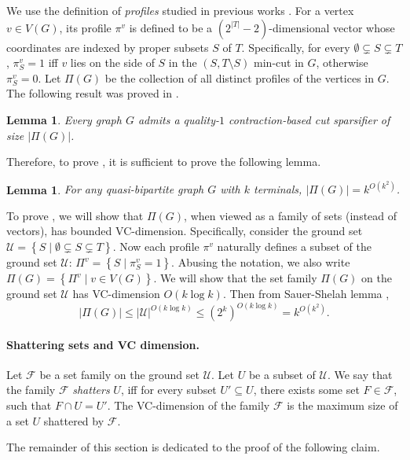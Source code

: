 \documentclass[11pt]{article}
\newtheorem{lemma}[theorem]{Lemma}
\theoremstyle{definition}
\newcommand{\set}[1]{\left\{ #1 \right\}}
\newcommand{\uset}{{\mathcal U}}
\newcommand{\fset}{{\mathcal{F}}}
\begin{document}
We use the definition of \emph{profiles} studied in previous works \cite{hagerup1998characterizing,khan2014mimicking}.
For a vertex $v\in V(G)$, its profile $\pi^v$ is defined to be a $(2^{|T|}-2)$-dimensional vector whose coordinates are indexed by proper subsets $S$ of $T$. Specifically, for every $\emptyset \subsetneq S\subsetneq T$, $\pi^v_S=1$ iff $v$ lies on the side of $S$ in the $(S,T \setminus S)$ min-cut in $G$, otherwise $\pi^v_S=0$. 
Let $\Pi(G)$ be the collection of all distinct profiles of the vertices in $G$.
The following result was proved in \cite{hagerup1998characterizing}.

\begin{lemma}
Every graph $G$ admits a quality-$1$ contraction-based cut sparsifier of size $|\Pi(G)|$.
\end{lemma}

Therefore, to prove , it is sufficient to prove the following lemma.

\begin{lemma} \label{quasi_profile}
For any quasi-bipartite graph $G$ with $k$ terminals, $|\Pi(G)|=k^{O(k^2)}$.
\end{lemma}

To prove , we will show that $\Pi(G)$, when viewed as a family of sets (instead of vectors), has bounded VC-dimension.
Specifically, consider the ground set $\uset=\set{S\mid \emptyset \subsetneq S\subsetneq T}$.
Now each profile $\pi^v$ naturally defines a subset of the ground set $\uset$: $\Pi^v=\set{S\mid \pi^v_S=1}$.
Abusing the notation, we also write $\Pi(G)=\set{\Pi^v\mid v\in V(G)}$.
We will show that the set family $\Pi(G)$ on the ground set $\uset$ has VC-dimension $O(k \log k)$. Then from Sauer-Shelah lemma \cite{shelah1972combinatorial,sauer1972density},  
$$|\Pi(G)|\le |\uset|^{O(k \log k)}\le (2^k)^{O(k \log k)} = k^{O(k^2)}.$$  

\paragraph{Shattering sets and VC dimension.} Let $\fset$ be a set family on the ground set $\uset$.
Let $U$ be a subset of $\uset$. We say that the family $\fset$ \emph{shatters} $U$, iff for every subset $U'\subseteq U$, there exists some set $F\in \fset$, such that $F\cap U=U'$. The VC-dimension of the family $\fset$ is the maximum size of a set $U$ shattered by $\fset$.

The remainder of this section is dedicated to the proof of the following claim.
\end{document}
